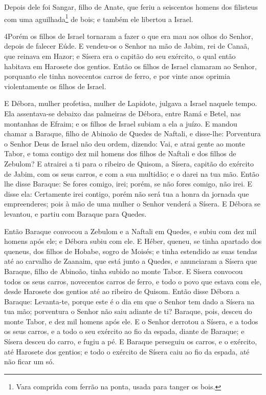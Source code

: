 Depois dele foi Sangar, filho de Anate, que feriu a seiscentos
homens dos filisteus com uma aguilhada\footnote{Vara comprida com
ferrão na ponta, usada para tanger os bois.} de bois; e também ele
libertou a Israel.

\medskip

\lettrine{4} Porém os filhos de Israel tornaram a fazer o que
era mau aos olhos do Senhor, depois de falecer Eúde. E vendeu-os
o Senhor na mão de Jabim, rei de Canaã, que reinava em Hazor; e
Sísera era o capitão do seu exército, o qual então habitava em
Harosete dos gentios. Então os filhos de Israel clamaram ao
Senhor, porquanto ele tinha novecentos carros de ferro, e por vinte
anos oprimia violentamente os filhos de Israel.

E Débora, mulher profetisa, mulher de Lapidote, julgava a Israel
naquele tempo. Ela assentava-se debaixo das palmeiras de Débora,
entre Ramá e Betel, nas montanhas de Efraim; e os filhos de Israel
subiam a ela a juízo. E mandou chamar a Baraque, filho de
Abinoão de Quedes de Naftali, e disse-lhe: Porventura o Senhor Deus
de Israel não deu ordem, dizendo: Vai, e atrai gente ao monte Tabor,
e toma contigo dez mil homens dos filhos de Naftali e dos filhos de
Zebulom? E atrairei a ti para o ribeiro de Quisom, a Sísera,
capitão do exército de Jabim, com os seus carros, e com a sua
multidão; e o darei na tua mão. Então lhe disse Baraque: Se
fores comigo, irei; porém, se não fores comigo, não irei. E
disse ela: Certamente irei contigo, porém não será tua a honra da
jornada que empreenderes; pois à mão de uma mulher o Senhor venderá
a Sísera. E Débora se levantou, e partiu com Baraque para Quedes.

Então Baraque convocou a Zebulom e a Naftali em Quedes, e subiu
com dez mil homens após ele; e Débora subiu com ele. E Héber,
queneu, se tinha apartado dos queneus, dos filhos de Hobabe, sogro
de Moisés; e tinha estendido as suas tendas até ao carvalho de
Zaanaim, que está junto a Quedes, e anunciaram a Sísera que
Baraque, filho de Abinoão, tinha subido ao monte Tabor. E
Sísera convocou todos os seus carros, novecentos carros de ferro, e
todo o povo que estava com ele, desde Harosete dos gentios até ao
ribeiro de Quisom. Então disse Débora a Baraque: Levanta-te,
porque este é o dia em que o Senhor tem dado a Sísera na tua mão;
porventura o Senhor não saiu adiante de ti? Baraque, pois, desceu do
monte Tabor, e dez mil homens após ele. E o Senhor derrotou a
Sísera, e a todos os seus carros, e a todo o seu exército ao fio da
espada, diante de Baraque; e Sísera desceu do carro, e fugiu a pé.
E Baraque perseguiu os carros, e o exército, até Harosete dos
gentios; e todo o exército de Sísera caiu ao fio da espada, até não
ficar um só.

